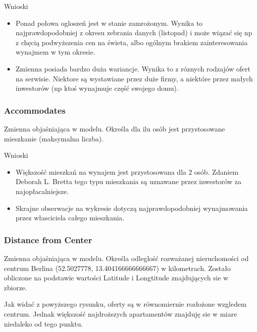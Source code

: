 
Wnioski

\begin{itemize}
    \item Ponad połowa ogloszeń jest w stanie zamrożonym.
    Wynika to najprawdopodobniej z okresu zebrania danych (listopad) i może wiązać się np z chęcią podwyższenia cen na świeta, albo ogólnym brakiem zainteresowania wynajmem w tym okresie.
    \item Zmienna posiada bardzo duża wariancje.
    Wynika to z róznych rodzajów ofert na serwisie.
    Niektore są wystawiane przez duże firmy, a niektóre przez małych inwestorów (np ktoś wynajmuje część swojego domu).
\end{itemize}

\subsubsection{Accommodates}\label{subsubsec:accommodates}
Zmienna objaśniająca w modelu.
Określa dla ilu osób jest przystosowane mieszkanie (maksymalna liczba).



Wnioski

\begin{itemize}
    \item Większość mieszkań na wynajem jest przystosowana dla 2 osób.
    Zdaniem Deborah L. Bretta\cite{realestate-market-analysis} tego typu mieszkania są uznawane przez inwestorów za najopłacalniejsze.
    \item Skrajne obserwacje na wykresie dotyczą najprawdopodobniej wynajmowania przez własciciela całego mieszkania.
\end{itemize}

\subsubsection{Distance from Center}\label{subsubsec:distance-from-center}
Zmienna objaśniająca w modelu.
Określa odleglość rozważanej nieruchomości od centrum Berlina (52.5027778, 13.404166666666667) w kilometrach.
Zostało obliczone na podstawie wartości Latitude i Longtitude znajdujących sie w zbiorze.

Jak widać z powyższego rysunku, oferty są w równomiernie rozłożone wzgledem centrum.
Jednak większość najdroższych apartamentów znajduję sie w miare niedaleko od tego punktu.

